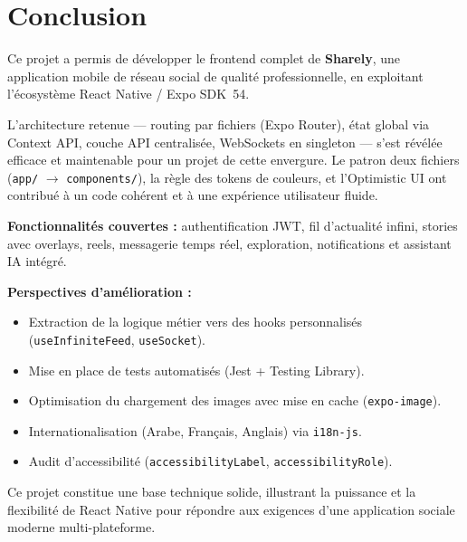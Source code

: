 \chapter*{Conclusion}

Ce projet a permis de développer le frontend complet de \textbf{Sharely}, une application mobile de réseau social de qualité professionnelle, en exploitant l'écosystème React Native / Expo SDK~54.

\medskip

L'architecture retenue --- routing par fichiers (Expo Router), état global via Context API, couche API centralisée, WebSockets en singleton --- s'est révélée efficace et maintenable pour un projet de cette envergure. Le patron deux fichiers (\texttt{app/} $\to$ \texttt{components/}), la règle des tokens de couleurs, et l'Optimistic UI ont contribué à un code cohérent et à une expérience utilisateur fluide.

\medskip

\textbf{Fonctionnalités couvertes :} authentification JWT, fil d'actualité infini, stories avec overlays, reels, messagerie temps réel, exploration, notifications et assistant IA intégré.

\medskip

\textbf{Perspectives d'amélioration :}
\begin{itemize}
  \item Extraction de la logique métier vers des hooks personnalisés (\texttt{useInfiniteFeed}, \texttt{useSocket}).
  \item Mise en place de tests automatisés (Jest + Testing Library).
  \item Optimisation du chargement des images avec mise en cache (\texttt{expo-image}).
  \item Internationalisation (Arabe, Français, Anglais) via \texttt{i18n-js}.
  \item Audit d'accessibilité (\texttt{accessibilityLabel}, \texttt{accessibilityRole}).
\end{itemize}

Ce projet constitue une base technique solide, illustrant la puissance et la flexibilité de React Native pour répondre aux exigences d'une application sociale moderne multi-plateforme.
